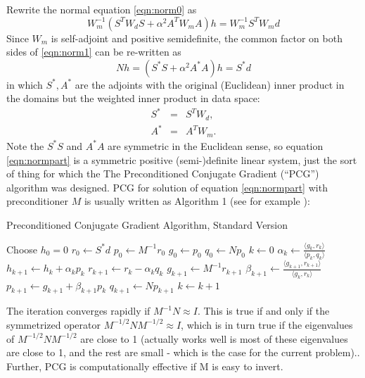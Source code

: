 \documentclass[12pt]{geophysics}
\begin{document}
Rewrite the normal equation \ref{eqn:norm0} as
\begin{equation}
  \label{eqn:norm1}
  W_m^{-1}(S^TW_dS + \alpha^2 A^TW_mA)h = W_m^{-1}S^TW_md 
\end{equation}
Since $W_m$ is self-adjoint and positive semidefinite, the common factor on both sides of \ref{eqn:norm1} can be re-written as
\begin{equation}
  \label{eqn:normpart}
  Nh = (S^*S + \alpha^2 A^*A)h = S^*d 
\end{equation}
in which $S^*, A^*$ are the adjoints with the original (Euclidean)
inner product in the domains but the weighted inner product in data
space:
\begin{eqnarray}
  \label{eqn:sadjwt}
  S^* &=& S^T W_d,\\
  A^* &=& A^T W_m.
\end{eqnarray}
Note the $S^*S$ and $A^*A$ are symmetric in the Euclidean sense, so
equation \ref{eqn:normpart} is a symmetric positive (semi-)definite
linear system, just the sort of thing for which the 
The Preconditioned Conjugate Gradient (``PCG'') algorithm was
designed. PCG for solution
of equation \ref{eqn:normpart} with preconditioner $M$ is usually
written as Algorithm 1 (see for example \cite{Golub:2012}):

\begin{algorithm}[H]
\caption{Preconditioned Conjugate Gradient Algorithm, Standard Version}
\begin{algorithmic}[1]
\State Choose $h_0=0$ 
  \State $r_0 \gets S^*d$
  \State $p_0 \gets M^{-1} r_0$
  \State $g_0 \gets p_0$
  \State $q_0 \gets Np_0$
  \State $k \gets 0$
  \Repeat
  \State $\alpha_k \gets \frac{\langle g_k,r_k \rangle}{\langle p_k,q_k\rangle}$
  \State $h_{k+1} \gets h_k + \alpha_k p_k$
  \State $r_{k+1} \gets r_k - \alpha_kq_k$
  \State $g_{k+1} \gets M^{-1} r_{k+1}$
  \State $\beta_{k+1} \gets \frac{\langle g_{k+1},r_{k+1}\rangle}{\langle g_k,r_k\rangle}$
  \State $p_{k+1}\gets g_{k+1}+\beta_{k+1}p_k$
  \State $q_{k+1} \gets Np_{k+1}$
  \State $k \gets k+1$
\end{algorithmic}
\end{algorithm}
The iteration converges rapidly if $M^{-1}N \approx I$. This is true
if and only if the symmetrized operator $M^{-1/2}NM^{-1/2} \approx I$,
which is in turn true if the eigenvalues of $M^{-1/2}NM^{-1/2}$ are
close to 1 (actually works well is most of these eigenvalues are close
to 1, and the rest are small - which is the case for the current
problem)..  Further, PCG is computationally effective if M is easy to
invert.
\end{document}
